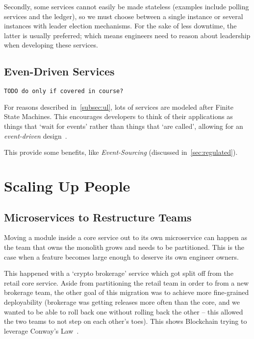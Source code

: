 \documentclass[conference]{IEEEtran}
\begin{document}
    Secondly, some services cannot easily be made stateless (examples include polling services
    and the ledger), so we must choose between a single instance or several instances with leader
    election mechanisms.
    For the sake of less downtime, the latter is usually preferred;
    which means engineers need to reason about leadership when developing these services.

    \subsection{Even-Driven Services}

    \texttt{TODO do only if covered in course?}

    For reasons described in~\ref{subsec:ul}, lots of services are modeled after Finite State
    Machines.
    This encourages developers to think of their applications as things that `wait for events'
    rather than things that `are called', allowing for an \emph{event-driven}
    design~\cite{fowlerEventDriven}.

    This provide some benefits, like \emph{Event-Sourcing} (discussed in~\ref{sec:regulated}).


    \section{Scaling Up People}

    \subsection{Microservices to Restructure Teams}

    Moving a module inside a core service out to its own microservice can happen as the team that
    owns the monolith grows and needs to be partitioned.
    This is the case when a feature becomes large enough to deserve its own engineer owners.

    This happened with a `crypto brokerage' service which got split off from the retail core
    service.
    Aside from partitioning the retail team in order to from a new brokerage team, the other goal of
    this migration was to achieve more fine-grained deployability (brokerage was getting releases
    more often than the core, and we wanted to be able to roll back one without rolling back the
    other -- this allowed the two teams to not step on each other's toes).
    This shows Blockchain trying to leverage Conway's Law~\cite{conwayLaw}.\\
\end{document}
